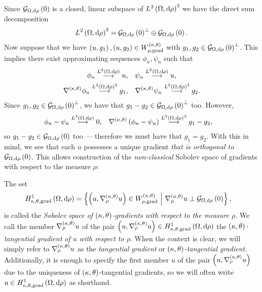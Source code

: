 Since $\gradZero{\ddom}{\rho}$ is a closed, linear subspace of $\ltwo{\ddom}{\rho}^3$ we have the direct sum decomposition
\begin{align*}
	\ltwo{\ddom}{\rho}^3 = \gradZero{\ddom}{\rho}^{\perp} \oplus \gradZero{\ddom}{\rho}.
\end{align*}
Now suppose that we have $\bracs{u,g_1}, \bracs{u,g_2}\in W^{\kt}_{\rho,\mathrm{grad}}$ with $g_1, g_2\in\gradZero{\ddom}{\rho}^\perp$.
This implies there exist approximating sequences $\phi_n, \psi_n$ such that
\begin{align*}
	\phi_n \lconv{\ltwo{\ddom}{\rho}} u, &\quad \psi_n \lconv{\ltwo{\ddom}{\rho}} u, \\
	\ktgrad\phi_n \lconv{\ltwo{\ddom}{\rho}^3} g_1, &\quad \ktgrad\psi_n \lconv{\ltwo{\ddom}{\rho}^3} g_2.
\end{align*}
Since $g_1, g_2\in \gradZero{\ddom}{\rho}^{\perp}$, we have that $g_1-g_2\in \gradZero{\ddom}{\rho}^{\perp}$ too.
However, 
\begin{align*}
	\phi_n - \psi_n \lconv{\ltwo{\ddom}{\rho}} 0, &\quad \ktgrad\bracs{\phi_n-\psi_n} \lconv{\ltwo{\ddom}{\rho}^3} g_1 - g_2,
\end{align*}
so $g_1 - g_2\in \gradZero{\ddom}{\rho}$ too --- therefore we must have that $g_1=g_2$.
With this in mind, we see that each $u$ possesses a unique gradient \emph{that is orthogonal to} $\gradZero{\ddom}{\rho}$.
This allows construction of the \emph{non-classical} Sobolev space of gradients with respect to the measure $\rho$:
\begin{definition} \label{def:3DGradSobSpace}
	The set
	\begin{align*}
		\ktgradSob{\ddom}{\rho} &= \clbracs{ \bracs{u, \ktgrad_{\rho}u}\in W^{\kt}_{\rho,\mathrm{grad}} \setVert \ktgrad_{\rho}u \perp \gradZero{\ddom}{\rho} },
	\end{align*}
	is called the \emph{Sobolev space of $\kt$-gradients with respect to the measure $\rho$}.
	We call the member $\ktgrad_{\rho}u$ of the pair $\bracs{u, \ktgrad_{\rho}u}\in\ktgradSob{\ddom}{\rho}$ the \emph{$\kt$-tangential gradient of $u$ with respect to $\rho$}.
	When the context is clear, we will simply refer to $\ktgrad_{\rho}u$ as the \emph{tangential gradient} or \emph{$\kt$-tangential gradient}.
	Additionally, it is enough to specify the first member $u$ of the pair $\bracs{u, \ktgrad_{\rho}u}$ due to the uniqueness of $\kt$-tangential gradients, so we will often write $u\in\ktgradSob{\ddom}{\rho}$ as shorthand.
\end{definition}


